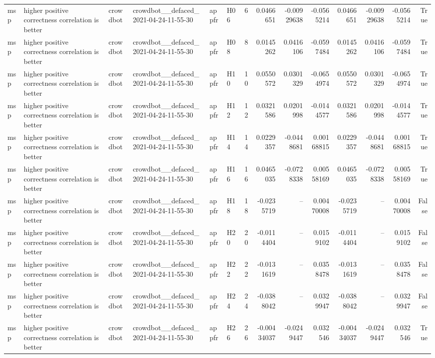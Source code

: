\begin{longtable}{llllllrrrrrrrr}
msp & higher positive correctness correlation is better & crowdbot & crowdbot\_\_defaced\_2021-04-24-11-55-30 & appfr & H06 & 6 & 0.0466651 & -0.00929638 & -0.0565214 & 0.0466651 & -0.00929638 & -0.0565214 & True \\
msp & higher positive correctness correlation is better & crowdbot & crowdbot\_\_defaced\_2021-04-24-11-55-30 & appfr & H08 & 8 & 0.0145262 & 0.0416106 & -0.0597484 & 0.0145262 & 0.0416106 & -0.0597484 & True \\
msp & higher positive correctness correlation is better & crowdbot & crowdbot\_\_defaced\_2021-04-24-11-55-30 & appfr & H10 & 10 & 0.0550572 & 0.0301329 & -0.0654974 & 0.0550572 & 0.0301329 & -0.0654974 & True \\
msp & higher positive correctness correlation is better & crowdbot & crowdbot\_\_defaced\_2021-04-24-11-55-30 & appfr & H12 & 12 & 0.0321586 & 0.0201998 & -0.0144577 & 0.0321586 & 0.0201998 & -0.0144577 & True \\
msp & higher positive correctness correlation is better & crowdbot & crowdbot\_\_defaced\_2021-04-24-11-55-30 & appfr & H14 & 14 & 0.0229357 & -0.0448681 & 0.00168815 & 0.0229357 & -0.0448681 & 0.00168815 & True \\
msp & higher positive correctness correlation is better & crowdbot & crowdbot\_\_defaced\_2021-04-24-11-55-30 & appfr & H16 & 16 & 0.0465035 & -0.0728338 & 0.00558169 & 0.0465035 & -0.0728338 & 0.00558169 & True \\
msp & higher positive correctness correlation is better & crowdbot & crowdbot\_\_defaced\_2021-04-24-11-55-30 & appfr & H18 & 18 & -0.0235719 & -- & 0.00470008 & -0.0235719 & -- & 0.00470008 & False \\
msp & higher positive correctness correlation is better & crowdbot & crowdbot\_\_defaced\_2021-04-24-11-55-30 & appfr & H20 & 20 & -0.0114404 & -- & 0.0159102 & -0.0114404 & -- & 0.0159102 & False \\
msp & higher positive correctness correlation is better & crowdbot & crowdbot\_\_defaced\_2021-04-24-11-55-30 & appfr & H22 & 22 & -0.0131619 & -- & 0.0358478 & -0.0131619 & -- & 0.0358478 & False \\
msp & higher positive correctness correlation is better & crowdbot & crowdbot\_\_defaced\_2021-04-24-11-55-30 & appfr & H24 & 24 & -0.0388042 & -- & 0.0329947 & -0.0388042 & -- & 0.0329947 & False \\
msp & higher positive correctness correlation is better & crowdbot & crowdbot\_\_defaced\_2021-04-24-11-55-30 & appfr & H26 & 26 & -0.00434037 & -0.0249447 & 0.032546 & -0.00434037 & -0.0249447 & 0.032546 & True \\

\end{longtable}
